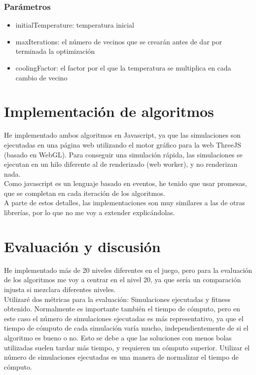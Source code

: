 \documentclass[a4paper, 11pt]{article}
\begin{document}
		\subsubsection{Parámetros}
			
			\begin{itemize}
				\item initialTemperature: temperatura inicial
				\item maxIterations: el número de vecinos que se crearán antes de dar por terminada la optimización
				\item coolingFactor: el factor por el que la temperatura se multiplica en cada cambio de vecino
			\end{itemize}

\section{Implementación de algoritmos}
	He implementado ambos algoritmos en Javascript, ya que las simulaciones son ejecutadas en una página web utilizando el motor gráfico para la web ThreeJS (basado en WebGL). Para conseguir una simulación rápida, las simulaciones se ejecutan en un hilo diferente al de renderizado (web worker), y no renderizan nada.  \\
	
	Como javascript es un lenguaje basado en eventos, he tenido que usar promesas, que se completan en cada iteración de los algoritmos. \\
	
	A parte de estos detalles, las implementaciones son muy similares a las de otras librerías, por lo que no me voy a extender explicándolas. \\ 
\section{Evaluación y discusión}
	He implementado más de 20 niveles diferentes en el juego, pero para la evaluación de los algoritmos me voy a centrar en el nivel 20, ya que sería un comparación injusta si mezclara diferentes niveles. \\
	
	Utilizaré dos métricas para la evaluación: Simulaciones ejecutadas y fitness obtenido. Normalmente es importante también el tiempo de cómputo, pero en este caso el número de simulaciones ejecutadas es más representativo, ya que el tiempo de cómputo de cada simulación varía mucho, independientemente de si el algoritmo es bueno o no. Esto se debe a que las soluciones con menos bolas utilizadas suelen tardar más tiempo, y requieren un cómputo superior. Utilizar el número de simulaciones ejecutadas es una manera de normalizar el tiempo de cómputo. \\
	
\end{document}
